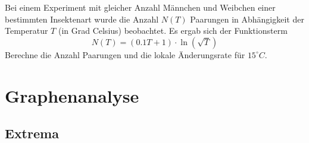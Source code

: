 \documentclass[%
11pt,%
twoside,%
titlepage,%
german,%
headsepline%
]{scrartcl}
\begin{document}
\begin{ueb}[Insekten]
Bei einem Experiment mit gleicher Anzahl M\"annchen und Weibchen einer bestimmten Insektenart wurde die Anzahl $N(T)$ Paarungen in Abh\"angigkeit der Temperatur $T$ (in Grad Celsius) beobachtet. Es ergab sich der Funktionsterm
$$N(T)=(0.1T+1)\cdot\ln(\sqrt{T})$$
Berechne die Anzahl Paarungen und die lokale \"Anderungsrate f\"ur $15^\circ C$.
\end{ueb}

\section{Graphenanalyse}

\subsection{Extrema}
\end{document}
